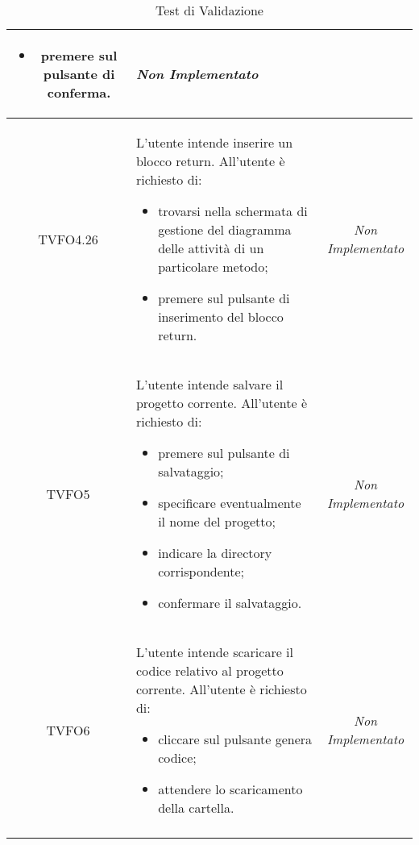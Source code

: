 \begin{longtable}{|c|>{}m{8cm}|c|}
\begin{itemize}
	\item premere sul pulsante di conferma.
\end{itemize} & \textit{Non Implementato}\\ \hline
\hypertarget{TVFO4.26}{TVFO4.26} & L'utente intende inserire un blocco return.
All'utente è richiesto di:
\begin{itemize}
	\item trovarsi nella schermata di gestione del diagramma delle attività di un particolare metodo;
	\item premere sul pulsante di inserimento del blocco return.
\end{itemize} & \textit{Non Implementato}\\ \hline
\hypertarget{TVFO5}{TVFO5} & L'utente intende salvare il progetto corrente.
All'utente è richiesto di:
\begin{itemize}
	\item premere sul pulsante di salvataggio;
	\item specificare eventualmente il nome del progetto;
	\item indicare la directory corrispondente;
	\item confermare il salvataggio.
\end{itemize} & \textit{Non Implementato}\\ \hline
\hypertarget{TVFO6}{TVFO6} & L'utente intende scaricare il codice relativo al progetto corrente.
All'utente è richiesto di:
\begin{itemize}
	\item cliccare sul pulsante genera codice;
	\item attendere lo scaricamento della cartella.
\end{itemize} & \textit{Non Implementato}\\ \hline
\caption[Test di Validazione]{Test di Validazione}
\label{tabella:test0}
\end{longtable}

